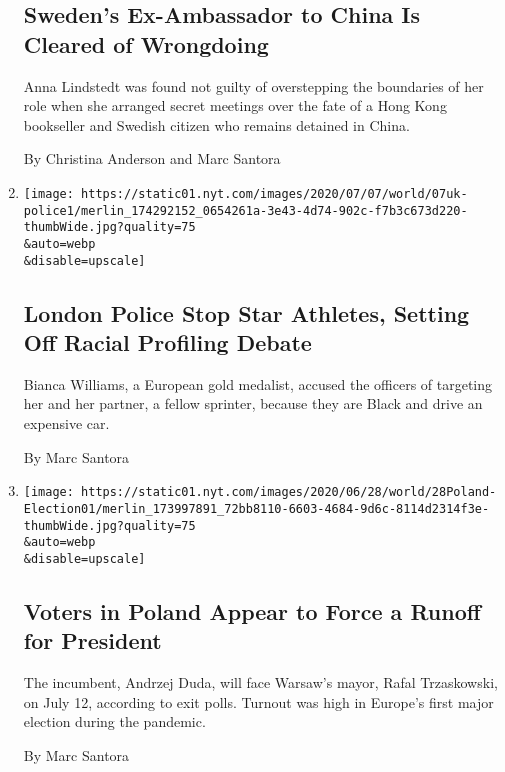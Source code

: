 \begin{enumerate}
  \hypertarget{swedens-ex-ambassador-to-china-is-cleared-of-wrongdoing}{%
  \subsection{Sweden's Ex-Ambassador to China Is Cleared of
  Wrongdoing}\label{swedens-ex-ambassador-to-china-is-cleared-of-wrongdoing}}

  Anna Lindstedt was found not guilty of overstepping the boundaries of
  her role when she arranged secret meetings over the fate of a Hong
  Kong bookseller and Swedish citizen who remains detained in China.

  By Christina Anderson and Marc Santora
\item
  \href{/2020/07/07/world/europe/uk-police-bianca-williams-racial-profiling.html}{}

  \texttt{[image: https://static01.nyt.com/images/2020/07/07/world/07uk-police1/merlin\_174292152\_0654261a-3e43-4d74-902c-f7b3c673d220-thumbWide.jpg?quality=75\\\&auto=webp\\\&disable=upscale]}

  \hypertarget{london-police-stop-star-athletes-setting-off-racial-profiling-debate}{%
  \subsection{London Police Stop Star Athletes, Setting Off Racial
  Profiling
  Debate}\label{london-police-stop-star-athletes-setting-off-racial-profiling-debate}}

  Bianca Williams, a European gold medalist, accused the officers of
  targeting her and her partner, a fellow sprinter, because they are
  Black and drive an expensive car.

  By Marc Santora
\item
  \href{/2020/06/28/world/europe/poland-election-coronavirus.html}{}

  \texttt{[image: https://static01.nyt.com/images/2020/06/28/world/28Poland-Election01/merlin\_173997891\_72bb8110-6603-4684-9d6c-8114d2314f3e-thumbWide.jpg?quality=75\\\&auto=webp\\\&disable=upscale]}

  \hypertarget{voters-in-poland-appear-to-force-a-runoff-for-president}{%
  \subsection{Voters in Poland Appear to Force a Runoff for
  President}\label{voters-in-poland-appear-to-force-a-runoff-for-president}}

  The incumbent, Andrzej Duda, will face Warsaw's mayor, Rafal
  Trzaskowski, on July 12, according to exit polls. Turnout was high in
  Europe's first major election during the pandemic.

  By Marc Santora
\end{enumerate}


